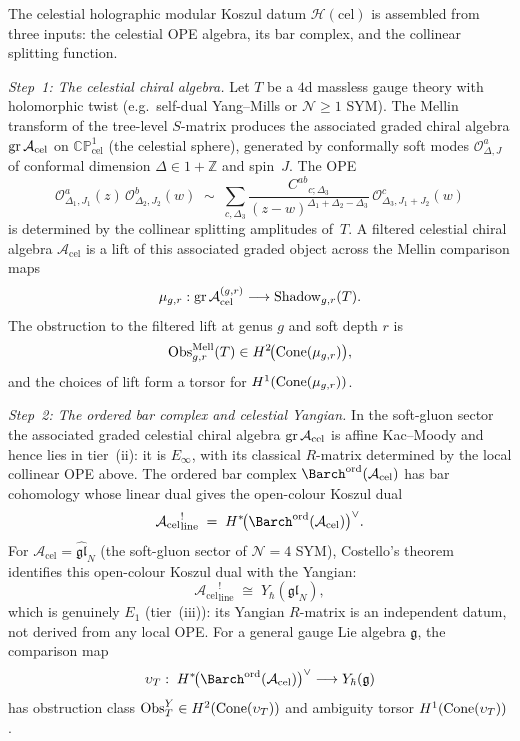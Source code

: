 \begin{construction}
\label{constr:celestial-hmkd}
The celestial holographic modular Koszul datum
$\mathcal{H}(\mathrm{cel})$ is assembled from three inputs:
the celestial OPE algebra, its bar complex, and the collinear
splitting function.

\emph{Step~1: The celestial chiral algebra.}
Let $T$ be a $4$d massless gauge theory with holomorphic twist
(e.g.\ self-dual Yang--Mills or $\mathcal N\ge 1$ SYM).
The Mellin transform of the tree-level $S$-matrix produces the associated graded chiral
algebra $\operatorname{gr}\mathcal{A}_{\mathrm{cel}}$ on
$\mathbb{CP}^1_{\mathrm{cel}}$ (the celestial sphere),
generated by conformally soft modes
$\mathcal{O}^a_{\Delta,J}$ of conformal dimension
$\Delta\in 1+\mathbb{Z}$ and spin~$J$. The OPE
\[
\mathcal{O}^a_{\Delta_1,J_1}(z)\,
\mathcal{O}^b_{\Delta_2,J_2}(w)
\;\sim\;
\sum_{c,\Delta_3}\frac{C^{ab}{}_{c;\Delta_3}}{(z-w)^{\Delta_1+\Delta_2-\Delta_3}}\,
\mathcal{O}^c_{\Delta_3,J_1+J_2}(w)
\]
is determined by the collinear splitting amplitudes of~$T$.
A filtered celestial chiral algebra $\mathcal{A}_{\mathrm{cel}}$ is a lift of this
associated graded object across the Mellin comparison maps
\[
\mu_{g,r}:\operatorname{gr}\mathcal{A}_{\mathrm{cel}}^{(g,r)}
\longrightarrow
\mathrm{Shadow}_{g,r}(T).
\]
The obstruction to the filtered lift at genus $g$ and soft depth $r$ is
\[
\operatorname{Obs}_{g,r}^{\mathrm{Mell}}(T)\in H^2\!\bigl(\operatorname{Cone}(\mu_{g,r})\bigr),
\]
and the choices of lift form a torsor for $H^1(\operatorname{Cone}(\mu_{g,r}))$.

\emph{Step~2: The ordered bar complex and celestial Yangian.}
In the soft-gluon sector the associated graded celestial chiral algebra
$\operatorname{gr}\mathcal{A}_{\mathrm{cel}}$ is affine Kac--Moody and hence
lies in tier~(ii): it is $E_\infty$, with its classical
$R$-matrix determined by the local collinear OPE above.
The ordered bar complex
${\Barch}^{\mathrm{ord}}(\mathcal{A}_{\mathrm{cel}})$ has bar
cohomology whose linear dual gives the open-colour Koszul dual
\[
{\mathcal{A}_{\mathrm{cel}}}^!_{\mathrm{line}}
\;=\;
H^*\!\bigl({\Barch}^{\mathrm{ord}}(\mathcal{A}_{\mathrm{cel}})\bigr)^\vee.
\]
For $\mathcal{A}_{\mathrm{cel}}=\widehat{\mathfrak{gl}}_N$
(the soft-gluon sector of $\mathcal{N}=4$ SYM), Costello's theorem
\cite{Cos13} identifies this open-colour Koszul dual with the Yangian:
\[
{\mathcal{A}_{\mathrm{cel}}}^!_{\mathrm{line}}
\;\cong\;
Y_\hbar(\mathfrak{gl}_N),
\]
which is genuinely $E_1$ (tier~(iii)): its Yangian
$R$-matrix is an independent datum, not derived from any
local OPE. For a general gauge Lie algebra $\mathfrak g$, the comparison map
\[
\upsilon_T:\;
H^*\!\bigl({\Barch}^{\mathrm{ord}}(\mathcal{A}_{\mathrm{cel}})\bigr)^\vee
\longrightarrow
Y_\hbar(\mathfrak g)
\]
has obstruction class $\operatorname{Obs}_T^{Y}\in H^2(\operatorname{Cone}(\upsilon_T))$ and ambiguity torsor
$H^1(\operatorname{Cone}(\upsilon_T))$.


\end{construction}
